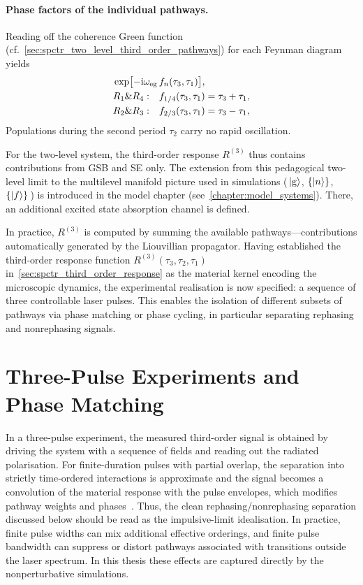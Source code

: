 \paragraph{Phase factors of the individual pathways.}
Reading off the coherence Green function (cf.~\autoref{sec:spctr_two_level_third_order_pathways}) for each Feynman diagram yields
\begin{align}
	    \exp\bigl[-\mathrm{i}\omega_{\mathrm{eg}}\,& f_n(\tau_3,\tau_1)\bigr],\notag\\
	    R_1 \text{\&} R_4:\quad & f_{1/4}(\tau_3,\tau_1) = \tau_3 + \tau_1,\notag\\
    R_2 \text{\&} R_3:\quad & f_{2/3}(\tau_3,\tau_1) = \tau_3 - \tau_1,
    \label{eq:spctr_pathway_phase_functions}
\end{align}
Populations during the second period $\tau_2$ carry no rapid oscillation.

For the two-level system, the third-order response $R^{(3)}$ thus contains contributions from GSB and SE only. The extension from this pedagogical two-level limit to the multilevel manifold picture used in simulations (\,$\ket{\mathrm{g}}$, $\{\ket{n}\}$, $\{\ket{f}\}$\,) is introduced in the model chapter (see~\autoref{chapter:model_systems}). There, an additional excited state absorption channel is defined.

In practice, $R^{(3)}$ is computed by summing the available pathways---contributions automatically generated by the Liouvillian propagator.
Having established the third-order response function $R^{(3)}(\tau_3,\tau_2,\tau_1)$ in~\autoref{sec:spctr_third_order_response} as the material kernel encoding the microscopic dynamics, the experimental realisation is now specified: a sequence of three controllable laser pulses.
This enables the isolation of different subsets of pathways via phase matching or phase cycling, in particular separating rephasing and nonrephasing signals.

\section{Three-Pulse Experiments and Phase Matching}
\label{sec:spctr_three_pulse_geometry}
In a three-pulse experiment, the measured third-order signal is obtained by driving the system with a sequence of fields and reading out the radiated polarisation.
For finite-duration pulses with partial overlap, the separation into strictly time-ordered interactions is approximate and the signal becomes a convolution of the material response with the pulse envelopes, which modifies pathway weights and phases~\cite{doetal2017simplifiedexpressionsthat}.
Thus, the clean rephasing/nonrephasing separation discussed below should be read as the impulsive-limit idealisation. In practice, finite pulse widths can mix additional effective orderings, and finite pulse bandwidth can suppress or distort pathways associated with transitions outside the laser spectrum.
In this thesis these effects are captured directly by the nonperturbative simulations.

